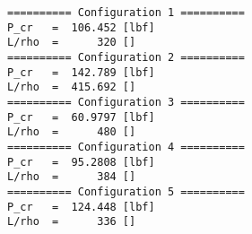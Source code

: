 \documentclass[12 pt]{article}
\begin{document}
\begin{verbatim}
========== Configuration 1 ==========
P_cr   =  106.452 [lbf]
L/rho  =      320 []
========== Configuration 2 ==========
P_cr   =  142.789 [lbf]
L/rho  =  415.692 []
========== Configuration 3 ==========
P_cr   =  60.9797 [lbf]
L/rho  =      480 []
========== Configuration 4 ==========
P_cr   =  95.2808 [lbf]
L/rho  =      384 []
========== Configuration 5 ==========
P_cr   =  124.448 [lbf]
L/rho  =      336 []
\end{verbatim}
\end{document}
